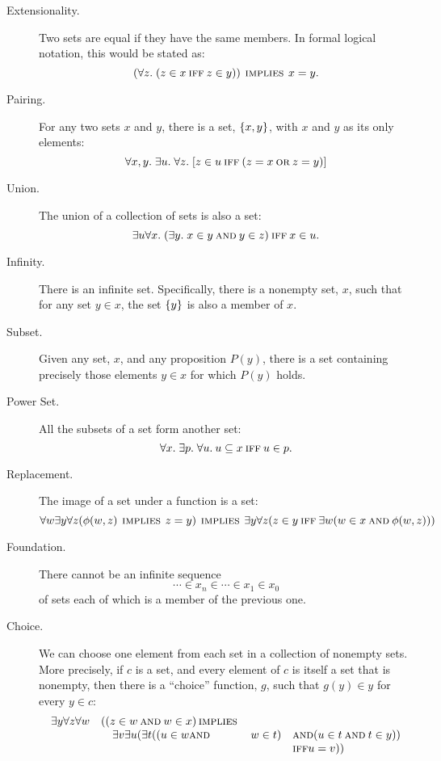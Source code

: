 \begin{description}

\item[Extensionality.] Two sets are equal if they have the same members.
In formal logical notation, this would be stated as:
\[
(\forall z.\; (z \in x \mathbin{\mathrm{\textsc{iff}}} z \in y)) \mathbin{\mathrm{\textsc{\,implies\,}}} x = y.
\]


\item[Pairing.] For any two sets $x$ and $y$, there is a set,
     $\left\{x,y\right\}$, with $x$ and $y$ as its only elements:
\[
\forall x,y.\; \exists u.\; \forall z.\;
[z \in u \mathbin{\mathrm{\textsc{iff}}} (z = x \mathbin{\mathrm{\textsc{or}}} z = y)]
\]

\item[Union.] The union of a collection of sets is also a set:
\[
\exists u \forall x.\; (\exists y.\; x \in y \mathbin{\mathrm{\textsc{and}}} y \in z) \mathbin{\mathrm{\textsc{iff}}} x \in u.
\]

\item[Infinity.]  There is an infinite set.  Specifically, there is a
  nonempty set, $x$, such that for any set $y \in x$, the set $\left\{y\right\}$ is
  also a member of $x$.

\item[Subset.] Given any set, $x$, and any proposition $P(y)$, there is a
  set containing precisely those elements $y \in x$ for which $P(y)$ holds.

\item[Power Set.]  All the subsets of a set form another set:
\[
\forall x.\; \exists p.\; \forall u.\: u \subseteq x \mathbin{\mathrm{\textsc{iff}}} u \in p.
\]

\item[Replacement.]  The image of a set under a function is a set:
\[
\forall w \exists y \forall z (\phi(w,z) \mathbin{\mathrm{\textsc{\,implies\,}}} z = y)
        \mathbin{\mathrm{\textsc{\,implies\,}}} \exists y \forall z (
            z \in y \mathbin{\mathrm{\textsc{iff}}} \exists w (w \in x \mathbin{\mathrm{\textsc{and}}} \phi(w,z)))
\]

\item[Foundation.] 
There cannot be an infinite sequence
\[
\cdots \in x_n \in \cdots \in x_1 \in x_0
\]
of sets each of which is a member of the previous one.

\iffalse  %
For every non-empty set, $x$, there is a set $y \in x$
  such that $x$ and $y$ have no elements in common.  
\fi

\item[Choice.]  We can choose one element from each set in a collection of
  nonempty sets.  More precisely, if $c$ is a set, and every element
  of $c$ is itself a set that is nonempty, then there is a ``choice''
  function, $g$, such that $g(y) \in y$ for every $y \in c$:
\[\begin{array}{rlll}
\exists y \forall z \forall w & ( (z \in w \mathbin{\mathrm{\textsc{and}}} w \in x) \mathbin{\mathrm{\textsc{\,implies\,}}}\\
                              &\quad \exists v \exists u (\exists t
                                           ((u \in w \mathbin{\mathrm{\textsc{and}}} & w \in t)
                                                              & \mathbin{\mathrm{\textsc{and}}} (u \in t \mathbin{\mathrm{\textsc{and}}} t \in y))\\
                                                            &&& \mathbin{\mathrm{\textsc{iff}}} u = v))
\end{array}\]

\end{description}


